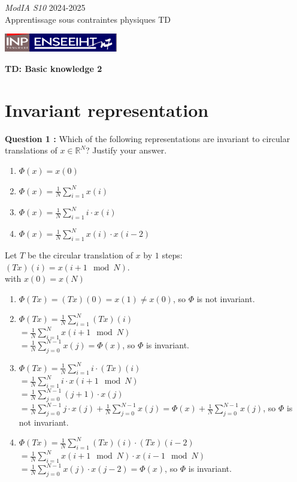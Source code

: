 \documentclass[12pt,a4paper]{article}
\newcommand{\entete}{
    \noindent\textit{ModIA S10} \hfill {2024-2025} \\
    {Apprentissage sous contraintes physiques} \hfill {TD} \\
    \begin{center}
        \includegraphics[height=0.8cm]{src/inp_n7.png}
    \end{center}
    \begin{center}
        \textbf{\LARGE TD: Basic knowledge 2}
    \end{center}
}
\begin{document}
\entete

\section{Invariant representation}

\noindent\textbf{Question 1 :}
Which of the following representations are invariant to circular translations of $x \in \mathbb{R}^N$? Justify your answer.

\begin{enumerate}
    \item $\Phi(x) = x(0)$
    \item $\Phi(x) = \frac{1}{N} \sum_{i=1}^N x(i)$
    \item $\Phi(x) = \frac{1}{N} \sum_{i=1}^N i \cdot x(i)$
    \item $\Phi(x) = \frac{1}{N} \sum_{i=1}^N x(i) \cdot x(i-2)$
\end{enumerate}

\color{blue}

Let $T$ be the circular translation of $x$ by $1$ steps: $(T x)(i) = x(i+1 \mod N)$. \\
with $x(0) = x(N)$


\begin{enumerate}
    \item $\Phi(T x) = (T x)(0) = x(1) \neq x(0)$, so $\Phi$ is not invariant.
    \item $\Phi(T x) = \frac{1}{N} \sum_{i=1}^N (T x)(i)$ \\
    $= \frac{1}{N} \sum_{i=1}^N x(i+1 \mod N)$ \\
    $ = \frac{1}{N} \sum_{j=0}^{N-1} x(j) = \Phi(x)$, so $\Phi$ is invariant.
    \item $\Phi(T x) = \frac{1}{N} \sum_{i=1}^N i \cdot (T x)(i)$ \\
    $ = \frac{1}{N} \sum_{i=1}^N i \cdot x(i+1 \mod N)$ \\
    $ = \frac{1}{N} \sum_{j=0}^{N-1} (j+1) \cdot x(j)$ \\
    $ = \frac{1}{N} \sum_{j=0}^{N-1} j \cdot x(j) + \frac{1}{N} \sum_{j=0}^{N-1} x(j) = \Phi(x) + \frac{1}{N} \sum_{j=0}^{N-1} x(j)$, so $\Phi$ is not invariant.
    \item $\Phi(T x) = \frac{1}{N} \sum_{i=1}^N (T x)(i) \cdot (T x)(i-2)$ \\
    $ = \frac{1}{N} \sum_{i=1}^N x(i+1 \mod N) \cdot x(i-1 \mod N)$ \\
    $ = \frac{1}{N} \sum_{j=0}^{N-1} x(j) \cdot x(j-2) = \Phi(x)$, so $\Phi$ is invariant.
\end{enumerate}
\end{document}

